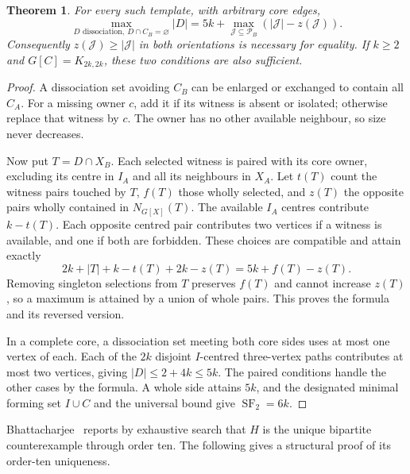 \documentclass[11pt]{article}
\newtheorem{theorem}{Theorem}
\newcommand{\SF}{\operatorname{SF}_2}
\begin{document}
\begin{theorem}\label{thm:paired}
For every such template, with arbitrary core edges,
\[
 \max_{D\text{ dissociation},\ D\cap C_B=\varnothing}|D|
 =5k+\max_{\mathcal J\subseteq\mathcal P_B}
          (|\mathcal J|-z(\mathcal J)).
\]
Consequently $z(\mathcal J)\ge|\mathcal J|$ in both orientations is
necessary for equality. If $k\ge2$ and $G[C]=K_{2k,2k}$, these two
conditions are also sufficient.
\end{theorem}
\begin{proof}
A dissociation set avoiding $C_B$ can be enlarged or exchanged to
contain all $C_A$. For a missing owner $c$, add it if its witness is
absent or isolated; otherwise replace that witness by $c$. The owner
has no other available neighbour, so size never decreases.

Now put $T=D\cap X_B$. Each selected witness is paired with its core
owner, excluding its centre in $I_A$ and all its neighbours in $X_A$.
Let $t(T)$ count the witness pairs touched by $T$, $f(T)$ those wholly
selected, and $z(T)$ the opposite pairs wholly contained in $N_{G[X]}(T)$.
The available $I_A$ centres contribute $k-t(T)$. Each opposite centred
pair contributes two vertices if a witness is available, and one if
both are forbidden. These choices are compatible and attain exactly
\[
 2k+|T|+k-t(T)+2k-z(T)=5k+f(T)-z(T).
\]
Removing singleton selections from $T$ preserves $f(T)$ and cannot
increase $z(T)$, so a maximum is attained by a union of whole pairs.
This proves the formula and its reversed version.

In a complete core, a dissociation set meeting both core sides uses
at most one vertex of each. Each of the $2k$ disjoint $I$-centred
three-vertex paths contributes at most two vertices, giving
$|D|\le2+4k\le5k$. The paired conditions handle the other cases by
the formula. A whole side attains $5k$, and the designated minimal
forming set $I\cup C$ and the universal bound give $\SF=6k$.
\end{proof}

Bhattacharjee~\cite[final computational remark]{Bhattacharjee} reports by exhaustive
search that $H$ is the unique bipartite counterexample through order ten.
The following gives a structural proof of its order-ten uniqueness.
\end{document}
